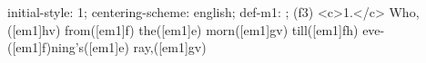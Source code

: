 initial-style: 1;
centering-scheme: english;
def-m1: \grealign;
(f3) <c>1.</c> Who,([em1]hv) from([em1]f) the([em1]e) morn([em1]gv) till([em1]fh) eve-([em1]f)ning's([em1]e) ray,([em1]gv)